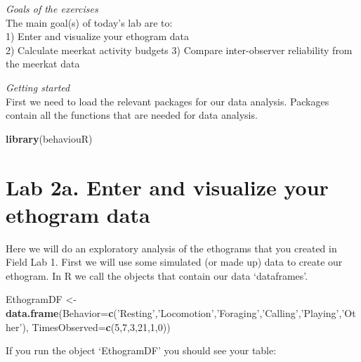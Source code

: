 \documentclass[]{book}
\newenvironment{Shaded}{\begin{snugshade}}{\end{snugshade}}
\newcommand{\DataTypeTok}[1]{\textcolor[rgb]{0.13,0.29,0.53}{#1}}
\newcommand{\DecValTok}[1]{\textcolor[rgb]{0.00,0.00,0.81}{#1}}
\newcommand{\KeywordTok}[1]{\textcolor[rgb]{0.13,0.29,0.53}{\textbf{#1}}}
\newcommand{\NormalTok}[1]{#1}
\newcommand{\StringTok}[1]{\textcolor[rgb]{0.31,0.60,0.02}{#1}}
\begin{document}
\emph{Goals of the exercises}\\
The main goal(s) of today's lab are to:\\
1) Enter and visualize your ethogram data\\
2) Calculate meerkat activity budgets
3) Compare inter-observer reliability from the meerkat data

\emph{Getting started}\\
First we need to load the relevant packages for our data analysis. Packages contain all the functions that are needed for data analysis.

\begin{Shaded}
\begin{Highlighting}[]
\KeywordTok{library}\NormalTok{(behaviouR)}
\end{Highlighting}
\end{Shaded}

\hypertarget{lab-2a.-enter-and-visualize-your-ethogram-data}{%
\section*{Lab 2a. Enter and visualize your ethogram data}\label{lab-2a.-enter-and-visualize-your-ethogram-data}}

Here we will do an exploratory analysis of the ethograms that you created in Field Lab 1.
First we will use some simulated (or made up) data to create our ethogram. In R we call the objects that contain our data `dataframes'.

\begin{Shaded}
\begin{Highlighting}[]
\NormalTok{EthogramDF <-}\StringTok{ }
\StringTok{  }\KeywordTok{data.frame}\NormalTok{(}\DataTypeTok{Behavior=}\KeywordTok{c}\NormalTok{(}\StringTok{'Resting'}\NormalTok{,}\StringTok{'Locomotion'}\NormalTok{,}\StringTok{'Foraging'}\NormalTok{,}\StringTok{'Calling'}\NormalTok{,}\StringTok{'Playing'}\NormalTok{,}\StringTok{'Other'}\NormalTok{),}
                 \DataTypeTok{TimesObserved=}\KeywordTok{c}\NormalTok{(}\DecValTok{5}\NormalTok{,}\DecValTok{7}\NormalTok{,}\DecValTok{3}\NormalTok{,}\DecValTok{21}\NormalTok{,}\DecValTok{1}\NormalTok{,}\DecValTok{0}\NormalTok{))}
\end{Highlighting}
\end{Shaded}

If you run the object `EthogramDF' you should see your table:
\end{document}
